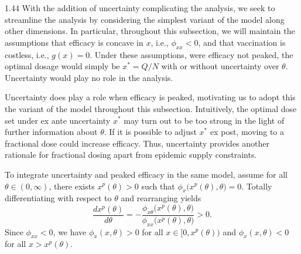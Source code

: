 \documentclass[12pt]{article}
\newcommand{\efficacy}{\phi}
\newcommand{\general}{g}
\newcommand{\xpeak}{x^{p}}
\begin{document}
\begin{spacing}{1.44}
With the addition of uncertainty complicating the analysis, we seek to
streamline the analysis by considering the simplest variant of the
model along other dimensions. In particular, throughout this
subsection, we will maintain the assumptions that efficacy is concave
in $x$, i.e., $\efficacy_{xx} < 0$, and that vaccination is costless,
i.e., $\general(x) = 0$. Under these assumptions, were efficacy not
peaked, the optimal dosage would simply be $x^* = Q/N$ with or without
uncertainty over $\theta$. Uncertainty would play no role in the
analysis.

Uncertainty does play a role when efficacy is peaked, motivating us to
adopt this the variant of the model throughout this
subsection. Intuitively, the optimal dose set under ex ante
uncertainty $x^*$ may turn out to be too strong in the light of
further information about $\theta$. If it is possible to adjust $x^*$
ex post, moving to a fractional dose could increase efficacy. Thus,
uncertainty provides another rationale for fractional dosing apart
from epidemic supply constraints.

To integrate uncertainty and peaked efficacy in the same model, assume
for all $\theta \in (0, \infty)$, there exists $\xpeak(\theta) > 0$
such that $\efficacy_{x} \bigl( \xpeak(\theta), \theta \bigr) =
0$. Totally differentiating with respect to $\theta$ and rearranging
yields
\begin{equation}
\label{dxpeak}
\frac{d \xpeak(\theta)}{d \theta} = - \frac{\efficacy_{x\theta} \bigl(
  \xpeak(\theta), \theta \bigr)}{\efficacy_{xx} \bigl( \xpeak(\theta),
  \theta \bigr)} > 0.
\end{equation}
Since $\efficacy_{xx} < 0$, we have $\efficacy_{x}( x, \theta) > 0$
for all $x \in \bigl[ 0, \xpeak(\theta) \bigr)$ and $\efficacy_{x}( x,
  \theta) < 0$ for all $x > \xpeak(\theta)$.
 

\end{spacing}
\end{document}
